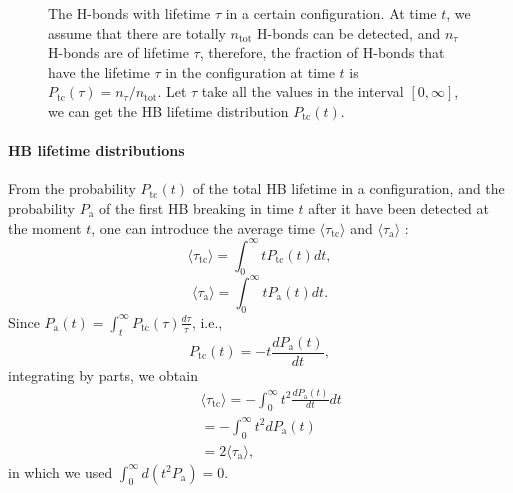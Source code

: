 {\begin{figure}
  \caption{\label{fig:P_tc} The H-bonds with lifetime $\tau$ in a certain configuration. 
At time $t$, we assume that there are totally $n_\text{tot}$ H-bonds can be detected, and $n_{\tau}$ H-bonds are of lifetime $\tau$, therefore,  the fraction of H-bonds that 
have the lifetime $\tau$ in the configuration at time $t$ is $P_\text{tc}(\tau) =  n_{\tau} /n_\text{tot}$.
Let $\tau$ take all the values in the interval $[0,\infty]$, we can get the HB lifetime distribution $P_\text{tc}(t)$.
}
\end{figure}

\paragraph{HB lifetime distributions}\label{diff_distr}
From the probability $P_\text{tc}(t)$ of the total HB lifetime in a configuration, and the probability $P_\text{a}$ of 
the first HB breaking in time $t$ after it have been detected at the moment $t$, one can introduce the average time 
$\langle \tau_\text{tc}\rangle$ and $\langle \tau_\text{a}\rangle$ :
\begin{equation}
\langle \tau_\text{tc}\rangle = \int_0^\infty t P_\text{tc}(t) dt,
\label{eq:tau_tc}
\end{equation}
\begin{equation}
\langle \tau_\text{a}\rangle = \int_0^\infty t P_\text{a}(t) dt. 
\label{eq:tau_a}
\end{equation}
Since $P_{\mathrm{a}}(t)=\int_{t}^{\infty} P_{\mathrm{tc}}(\tau) \frac{d \tau}{\tau}$, i.e., 
\begin{equation}
P_\text{tc}(t) = -t\frac{dP_\text{a}(t)}{dt}, \nonumber
\label{eq:relation_Ptc--Pa}
\end{equation}
integrating by parts, we obtain
\begin{eqnarray}
&&\langle \tau_\text{tc}\rangle = -\int_0^\infty t^2 \frac{dP_{\mathrm{a}}(t)}{dt}dt \nonumber \\
%
&&= -\int_0^\infty t^2 dP_\text{a}(t) \nonumber\\
&&= 2\langle \tau_\text{a}\rangle,\nonumber
\end{eqnarray}
in which we used $\int_0^\infty d(t^2 P_\text{a})=0$.

}
